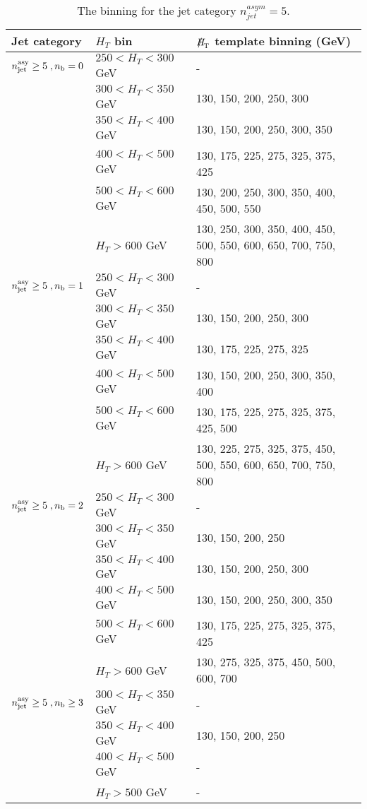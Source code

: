 \begin{table}[h!]
  \scriptsize
  \centering
  \caption{The \MHT binning for the jet category $n_{jet}^{asym} = 5$. 
  \label{tab:mhtBins_ge5a}}
  \begin{tabular}{ lll }
    Jet category & $H_{T}$ bin & $\MHT$ template binning (GeV) \\ \hline

    \hline
    $n_{\text{jet}}^{\mathrm{asy}} \geq 5 \;, n_{\text{b}} = 0 $ & $250 < H_{T} < 300$ GeV & - \\ 
     & $300 < H_{T} < 350$ GeV & 130, 150, 200, 250, 300 \\ 
     & $350 < H_{T} < 400$ GeV & 130, 150, 200, 250, 300, 350 \\ 
     & $400 < H_{T} < 500$ GeV & 130, 175, 225, 275, 325, 375, 425 \\ 
     & $500 < H_{T} < 600$ GeV & 130, 200, 250, 300, 350, 400, 450, 500, 550 \\ 
     & $H_{T} > 600$ GeV & 130, 250, 300, 350, 400, 450, 500, 550, 600, 650, 700, 750, 800 \\ 
    \hline
    $n_{\text{jet}}^{\mathrm{asy}} \geq 5 \;, n_{\text{b}} = 1$ & $250 < H_{T} < 300$ GeV & - \\ 
     & $300 < H_{T} < 350$ GeV & 130, 150, 200, 250, 300 \\ 
     & $350 < H_{T} < 400$ GeV & 130, 175, 225, 275, 325 \\ 
     & $400 < H_{T} < 500$ GeV & 130, 150, 200, 250, 300, 350, 400 \\ 
     & $500 < H_{T} < 600$ GeV & 130, 175, 225, 275, 325, 375, 425, 500 \\ 
     & $H_{T} > 600$ GeV & 130, 225, 275, 325, 375, 450, 500, 550, 600, 650, 700, 750, 800 \\ 
    \hline
    $n_{\text{jet}}^{\mathrm{asy}} \geq 5 \;, n_{\text{b}} = 2$ & $250 < H_{T} < 300$ GeV & - \\ 
     & $300 < H_{T} < 350$ GeV & 130, 150, 200, 250 \\ 
     & $350 < H_{T} < 400$ GeV & 130, 150, 200, 250, 300 \\ 
     & $400 < H_{T} < 500$ GeV & 130, 150, 200, 250, 300, 350 \\ 
     & $500 < H_{T} < 600$ GeV & 130, 175, 225, 275, 325, 375, 425 \\ 
     & $H_{T} > 600$ GeV & 130, 275, 325, 375, 450, 500, 600, 700 \\ 
    \hline
    $n_{\text{jet}}^{\mathrm{asy}} \geq 5 \;, n_{\text{b}} \geq 3$ & $300 < H_{T} < 350$ GeV & - \\ 
     & $350 < H_{T} < 400$ GeV & 130, 150, 200, 250 \\ 
     & $400 < H_{T} < 500$ GeV & - \\ 
     & $H_{T} > 500$ GeV & - \\ 

  \end{tabular}
\end{table}
